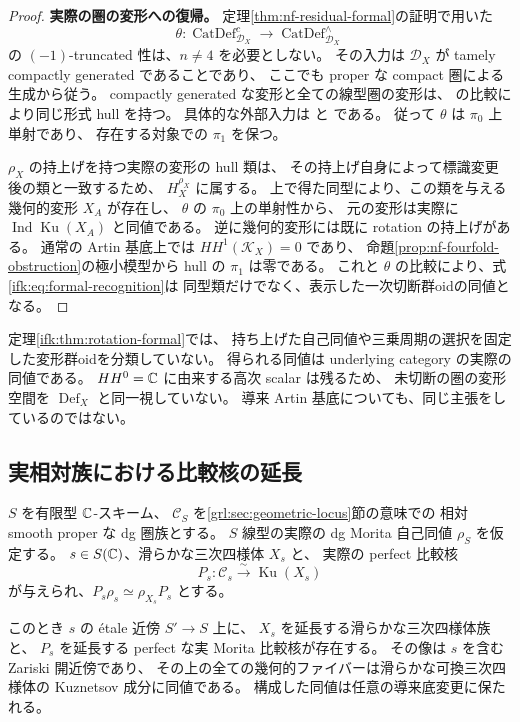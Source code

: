 \begin{proof}
\textbf{実際の圏の変形への復帰。}
定理\ref{thm:nf-residual-formal}の証明で用いた
\[
 \theta:\operatorname{CatDef}^c_{\mathcal D_X}
       \longrightarrow\operatorname{CatDef}^{\wedge}_{\mathcal D_X}
\]
の $(-1)$-truncated 性は、$n\ne4$ を必要としない。
その入力は $\mathcal D_X$ が tamely compactly generated であることであり、
ここでも proper な compact 圏による生成から従う。
compactly generated な変形と全ての線型圏の変形は、
\cite[Remarks~5.3.9 and~5.1.11]{NFDAGX}の比較により同じ形式 hull を持つ。
具体的な外部入力は
\cite[Theorems~5.1.9, 5.3.16, Proposition~5.3.21]{NFDAGX}と
\cite[Sections~3.3 and~4.3]{NFBKP}である。
従って $\theta$ は $\pi_0$ 上単射であり、
存在する対象での $\pi_1$ を保つ。

$\rho_X$ の持上げを持つ実際の変形の hull 類は、
その持上げ自身によって標識変更後の類と一致するため、
$H_X^{\rho_X}$ に属する。
上で得た同型により、この類を与える幾何的変形 $X_A$ が存在し、
$\theta$ の $\pi_0$ 上の単射性から、
元の変形は実際に $\operatorname{Ind}\operatorname{Ku}(X_A)$ と同値である。
逆に幾何的変形には既に rotation の持上げがある。
通常の Artin 基底上では $HH^1(\mathcal K_X)=0$ であり、
命題\ref{prop:nf-fourfold-obstruction}の極小模型から hull の $\pi_1$ は零である。
これと $\theta$ の比較により、式\eqref{ifk:eq:formal-recognition}は
同型類だけでなく、表示した一次切断群oidの同値となる。
\end{proof}

\begin{remark}[追加標識と高次群oid]
\label{ifk:rem:formal-scope}
定理\ref{ifk:thm:rotation-formal}では、
持ち上げた自己同値や三乗周期の選択を固定した変形群oidを分類していない。
得られる同値は underlying category の実際の同値である。
$HH^0=\mathbb C$ に由来する高次 scalar は残るため、
未切断の圏の変形空間を $\operatorname{Def}_X$ と同一視していない。
導来 Artin 基底についても、同じ主張をしているのではない。
\end{remark}

\subsection{実相対族における比較核の延長}

\begin{theorem}
\label{ifk:thm:rotation-neighborhood}
$S$ を有限型 $\mathbb C$-スキーム、
$\mathcal C_S$ を\ref{grl:sec:geometric-locus}節の意味での
相対 smooth proper な dg 圏族とする。
$S$ 線型の実際の dg Morita 自己同値 $\rho_S$ を仮定する。
$s\in S(\mathbb C)$、滑らかな三次四様体 $X_s$ と、
実際の perfect 比較核
\[
 P_s:\mathcal C_s\xrightarrow{\sim}\operatorname{Ku}(X_s)
\]
が与えられ、$P_s\rho_s\simeq\rho_{X_s}P_s$ とする。

このとき $s$ の \'etale 近傍 $S'\to S$ 上に、
$X_s$ を延長する滑らかな三次四様体族と、
$P_s$ を延長する perfect な実 Morita 比較核が存在する。
その像は $s$ を含む Zariski 開近傍であり、
その上の全ての幾何的ファイバーは滑らかな可換三次四様体の
Kuznetsov 成分に同値である。
構成した同値は任意の導来底変更に保たれる。
\end{theorem}

